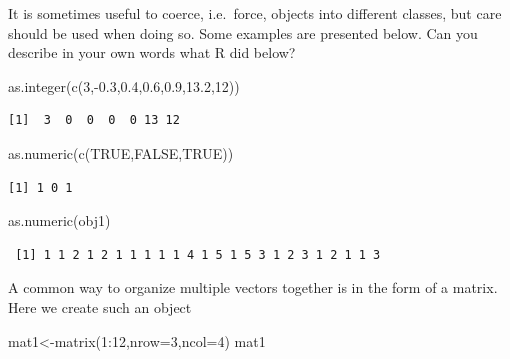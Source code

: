 \documentclass[
  letterpaper,
  DIV=11,
  numbers=noendperiod]{scrartcl}
\newenvironment{Shaded}{\begin{snugshade}}{\end{snugshade}}
\newcommand{\AttributeTok}[1]{\textcolor[rgb]{0.40,0.45,0.13}{#1}}
\newcommand{\ConstantTok}[1]{\textcolor[rgb]{0.56,0.35,0.01}{#1}}
\newcommand{\DecValTok}[1]{\textcolor[rgb]{0.68,0.00,0.00}{#1}}
\newcommand{\FloatTok}[1]{\textcolor[rgb]{0.68,0.00,0.00}{#1}}
\newcommand{\FunctionTok}[1]{\textcolor[rgb]{0.28,0.35,0.67}{#1}}
\newcommand{\NormalTok}[1]{\textcolor[rgb]{0.00,0.23,0.31}{#1}}
\newcommand{\OtherTok}[1]{\textcolor[rgb]{0.00,0.23,0.31}{#1}}
\newcommand{\SpecialCharTok}[1]{\textcolor[rgb]{0.37,0.37,0.37}{#1}}
\begin{document}
It is sometimes useful to coerce, i.e.~force, objects into different
classes, but care should be used when doing so. Some examples are
presented below. Can you describe in your own words what R did below?

\begin{Shaded}
\begin{Highlighting}[]
\FunctionTok{as.integer}\NormalTok{(}\FunctionTok{c}\NormalTok{(}\DecValTok{3}\NormalTok{,}\SpecialCharTok{{-}}\FloatTok{0.3}\NormalTok{,}\FloatTok{0.4}\NormalTok{,}\FloatTok{0.6}\NormalTok{,}\FloatTok{0.9}\NormalTok{,}\FloatTok{13.2}\NormalTok{,}\DecValTok{12}\NormalTok{))}
\end{Highlighting}
\end{Shaded}

\begin{verbatim}
[1]  3  0  0  0  0 13 12
\end{verbatim}

\begin{Shaded}
\begin{Highlighting}[]
\FunctionTok{as.numeric}\NormalTok{(}\FunctionTok{c}\NormalTok{(}\ConstantTok{TRUE}\NormalTok{,}\ConstantTok{FALSE}\NormalTok{,}\ConstantTok{TRUE}\NormalTok{))}
\end{Highlighting}
\end{Shaded}

\begin{verbatim}
[1] 1 0 1
\end{verbatim}

\begin{Shaded}
\begin{Highlighting}[]
\FunctionTok{as.numeric}\NormalTok{(obj1)}
\end{Highlighting}
\end{Shaded}

\begin{verbatim}
 [1] 1 1 2 1 2 1 1 1 1 1 4 1 5 1 5 3 1 2 3 1 2 1 1 3
\end{verbatim}

A common way to organize multiple vectors together is in the form of a
matrix. Here we create such an object

\begin{Shaded}
\begin{Highlighting}[]
\NormalTok{mat1}\OtherTok{\textless{}{-}}\FunctionTok{matrix}\NormalTok{(}\DecValTok{1}\SpecialCharTok{:}\DecValTok{12}\NormalTok{,}\AttributeTok{nrow=}\DecValTok{3}\NormalTok{,}\AttributeTok{ncol=}\DecValTok{4}\NormalTok{)}
\NormalTok{mat1}
\end{Highlighting}
\end{Shaded}
\end{document}
